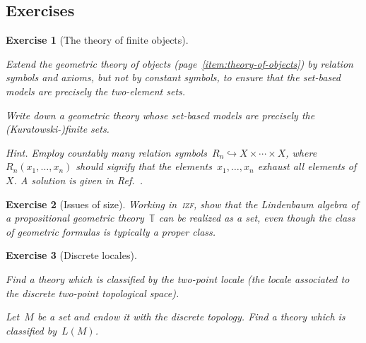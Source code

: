 \documentclass{ws-rv9x6}
\newtheorem{ex}{Exercise}
\newenvironment{exercise}[1]{
  \begin{ex}[#1]
}{\end{ex}}
\newcommand{\TT}{\mathbb{T}}
\renewcommand{\_}{\mathpunct{.}}
\newcommand{\?}{\,{:}\,}
\begin{document}
\subsection*{Exercises}

\begin{exercise}{The theory of finite objects}%
\begin{alphlist}[(c)]
\item Extend the geometric theory of objects
(page~\ref{item:theory-of-objects}) by relation symbols and axioms, but not by
constant symbols, to ensure that the set-based models are precisely the
two-element sets.
\item Write down a geometric theory whose set-based models are precisely the
(Kuratowski-)finite sets.\smallskip

{\scriptsize\emph{Hint.} Employ countably many relation symbols~$R_n
\hookrightarrow X \times \cdots \times X$, where~$R_n(x_1,\ldots,x_n)$ should
signify that the elements~$x_1,\ldots,x_n$ exhaust all elements of~$X$. A
solution is given in Ref.~\cite[Example~D1.1.7(k)]{johnstone:elephant}.\par}
\end{alphlist}
\end{exercise}

\begin{exercise}{Issues of size}%
Working in~\textsc{izf}, show that the Lindenbaum algebra of a propositional
geometric theory~$\TT$ can be realized as a set, even though the class of
geometric formulas is typically a proper class.\smallskip

\end{exercise}

\begin{exercise}{Discrete locales}%
\begin{alphlist}[(b)]
\item Find a theory which is classified by the two-point locale (the locale
associated to the discrete two-point topological space).
\item Let~$M$ be a set and endow it with the discrete topology. Find a theory
which is classified by~$L(M)$.
\end{alphlist}
\end{exercise}
\end{document}
